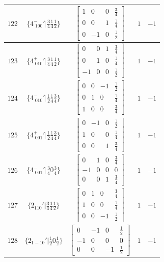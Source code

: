 \documentclass[fleqn,8pt]{jsarticle}
\begin{document}
\begin{longtable}{ccccc}
$ 122 $ & $ \{4^{-}_{\,\,100}{}'|\frac{3}{4} \frac{1}{4} \frac{1}{2}\} $ & $ \begin{bmatrix} 1 & 0 & 0 & \frac{3}{4} \\ 0 & 0 & 1 & \frac{1}{4} \\ 0 & -1 & 0 & \frac{1}{2} \end{bmatrix} $ & $ 1 $ & $ -1 $ \\ \hline
$ 123 $ & $ \{4^{+}_{\,\,010}{}'|\frac{3}{4} \frac{1}{4} \frac{1}{2}\} $ & $ \begin{bmatrix} 0 & 0 & 1 & \frac{3}{4} \\ 0 & 1 & 0 & \frac{1}{4} \\ -1 & 0 & 0 & \frac{1}{2} \end{bmatrix} $ & $ 1 $ & $ -1 $ \\ \hline
$ 124 $ & $ \{4^{-}_{\,\,010}{}'|\frac{1}{2} \frac{1}{4} \frac{3}{4}\} $ & $ \begin{bmatrix} 0 & 0 & -1 & \frac{1}{2} \\ 0 & 1 & 0 & \frac{1}{4} \\ 1 & 0 & 0 & \frac{3}{4} \end{bmatrix} $ & $ 1 $ & $ -1 $ \\ \hline
$ 125 $ & $ \{4^{+}_{\,\,001}{}'|\frac{1}{2} \frac{1}{4} \frac{3}{4}\} $ & $ \begin{bmatrix} 0 & -1 & 0 & \frac{1}{2} \\ 1 & 0 & 0 & \frac{1}{4} \\ 0 & 0 & 1 & \frac{3}{4} \end{bmatrix} $ & $ 1 $ & $ -1 $ \\ \hline
$ 126 $ & $ \{4^{-}_{\,\,001}{}'|\frac{3}{4} 0 \frac{3}{4}\} $ & $ \begin{bmatrix} 0 & 1 & 0 & \frac{3}{4} \\ -1 & 0 & 0 & 0 \\ 0 & 0 & 1 & \frac{3}{4} \end{bmatrix} $ & $ 1 $ & $ -1 $ \\ \hline
$ 127 $ & $ \{2{}_{110}{}'|\frac{3}{4} \frac{1}{4} \frac{1}{2}\} $ & $ \begin{bmatrix} 0 & 1 & 0 & \frac{3}{4} \\ 1 & 0 & 0 & \frac{1}{4} \\ 0 & 0 & -1 & \frac{1}{2} \end{bmatrix} $ & $ 1 $ & $ -1 $ \\ \hline
$ 128 $ & $ \{2{}_{1-10}{}'|\frac{1}{2} 0 \frac{1}{2}\} $ & $ \begin{bmatrix} 0 & -1 & 0 & \frac{1}{2} \\ -1 & 0 & 0 & 0 \\ 0 & 0 & -1 & \frac{1}{2} \end{bmatrix} $ & $ 1 $ & $ -1 $ \\ \hline

\end{longtable}
\end{document}
